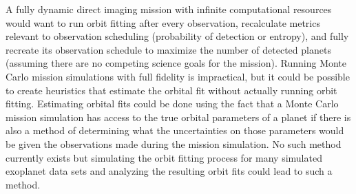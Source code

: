 A fully dynamic direct imaging mission with infinite computational resources
would want to run orbit fitting after every observation, recalculate metrics
relevant to observation scheduling (probability of detection or entropy), and
fully recreate its observation schedule to maximize the number of detected
planets (assuming there are no competing science goals for the mission).
Running Monte Carlo mission simulations with full fidelity is impractical,
but it could be possible to create heuristics that estimate the orbital fit
without actually running orbit fitting. Estimating orbital fits could be done
using the fact that a Monte Carlo mission simulation has access to the true
orbital parameters of a planet if there is also a method of determining what
the uncertainties on those parameters would be given the observations made
during the mission simulation. No such method currently exists but simulating
the orbit fitting process for many simulated exoplanet data sets and analyzing
the resulting orbit fits could lead to such a method.
